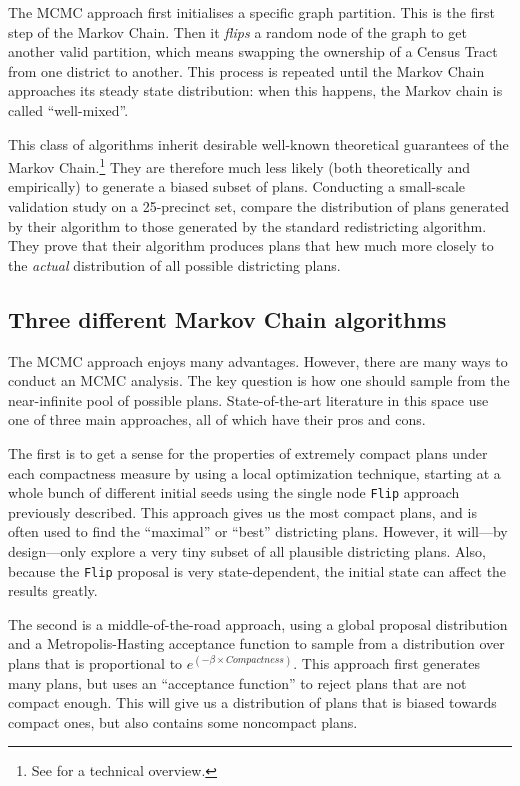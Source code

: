 \documentclass[]{article}
\begin{document}
The MCMC approach first initialises a specific graph partition. This is
the first step of the Markov Chain. Then it \emph{flips} a random node
of the graph to get another valid partition, which means swapping the
ownership of a Census Tract from one district to another. This process
is repeated until the Markov Chain approaches its steady state
distribution: when this happens, the Markov chain is called
``well-mixed''.

This class of algorithms inherit desirable well-known theoretical
guarantees of the Markov Chain.\footnote{See \cite{ddj2019recom} for a
  technical overview.} They are therefore much less likely (both
theoretically and empirically) to generate a biased subset of plans.
Conducting a small-scale validation study on a 25-precinct set,
\citeauthor{fifieldwp} compare the distribution of plans generated by
their algorithm to those generated by the standard redistricting
algorithm. They prove that their algorithm produces plans that hew much
more closely to the \emph{actual} distribution of all possible
districting plans.

\hypertarget{three-different-markov-chain-algorithms}{%
\subsection{Three different Markov Chain
algorithms}\label{three-different-markov-chain-algorithms}}

The MCMC approach enjoys many advantages. However, there are many ways
to conduct an MCMC analysis. The key question is how one should sample
from the near-infinite pool of possible plans. State-of-the-art
literature in this space use one of three main approaches, all of which
have their pros and cons.

The first is to get a sense for the properties of extremely compact
plans under each compactness measure by using a local optimization
technique, starting at a whole bunch of different initial seeds using
the single node \texttt{Flip} approach previously described. This
approach gives us the most compact plans, and is often used to find the
``maximal'' or ``best'' districting plans. However, it will---by
design---only explore a very tiny subset of all plausible districting
plans. Also, because the \texttt{Flip} proposal is very state-dependent,
the initial state can affect the results greatly.

The second is a middle-of-the-road approach, using a global proposal
distribution and a Metropolis-Hasting acceptance function to sample from
a distribution over plans that is proportional to
\(e^{(-\beta \times Compactness)}\). This approach first generates many
plans, but uses an ``acceptance function'' to reject plans that are not
compact enough. This will give us a distribution of plans that is biased
towards compact ones, but also contains some noncompact plans.
\end{document}
